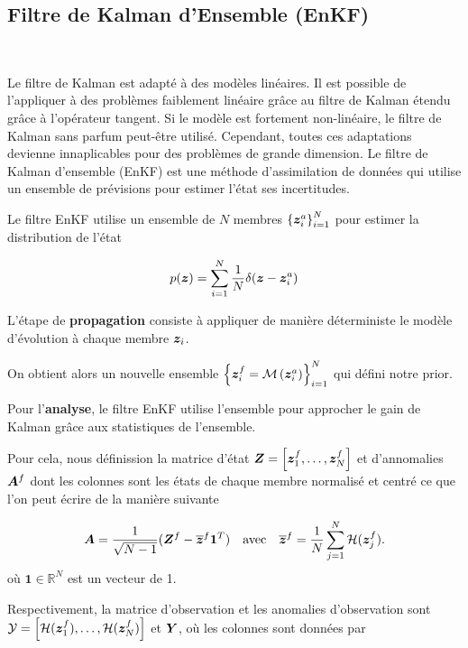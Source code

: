 \subsection{Filtre de Kalman d'Ensemble (EnKF)}~\label{sec:enkf}

Le filtre de Kalman est adapté à des modèles linéaires. Il est possible de l'appliquer à des problèmes faiblement linéaire grâce au filtre de Kalman étendu grâce à l'opérateur tangent. Si le modèle est fortement non-linéaire, le filtre de Kalman sans parfum peut-être utilisé. Cependant, toutes ces adaptations devienne innaplicables pour des problèmes de grande dimension.
Le filtre de Kalman d'ensemble (EnKF) est une méthode d'assimilation de données qui utilise un ensemble de prévisions pour estimer l'état ses incertitudes.

Le filtre EnKF utilise un ensemble de $N$ membres $\left\{\bm {\bm{z}}^a_i \right\}_{i=1}^N$ pour estimer la distribution de l'état

\begin{equation*}
    p(\bm{z}) = \sum_{i=1}^{N} \frac{1}{N} \delta(\bm z - \bm z^a_i)
\end{equation*}

L'étape de \textbf{propagation} consiste à appliquer de manière déterministe le modèle d'évolution à chaque membre $\bm z_i$.

On obtient alors un nouvelle ensemble $\left\{\bm {\bm{z}}^f_{i}= \mathcal M\left(\bm z_i^a\right) \right\}_{i=1}^N$ qui défini notre prior.

Pour l'\textbf{analyse}, le filtre EnKF utilise l'ensemble pour approcher le gain de Kalman grâce aux statistiques de l'ensemble.

Pour cela, nous définission la matrice d'état $\bm{Z} = \left[\bm{z}^f_1, \dots, \bm{z}^f_N\right]$ et d'annomalies $\bm A^f$ dont les colonnes sont les états de chaque membre normalisé et centré ce que l'on peut écrire de la manière suivante

\begin{equation*}
    \bm A = \frac{1}{\sqrt{N - 1}}(\bm Z^f - \overline{\bm{z}}^f \bm{1}^T) \quad \text{avec} \quad \overline{\bm{z}}^f = \frac{1}{N} \sum_{j=1}^{N} \mathcal{H}(\bm{z}_j^f).
\end{equation*}où $\bm{1} \in \mathbb{R}^N$ est un vecteur de 1.

Respectivement, la matrice d'observation et les anomalies d'observation sont $\mathcal Y = \left[\mathcal{H}(\bm{z}_1^f), \dots, \mathcal{H}(\bm{z}_N^f)\right]$ et $\bm Y$, où les colonnes sont données par


